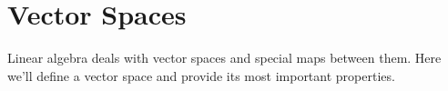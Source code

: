 \chapter{Vector Spaces}

Linear algebra deals with vector spaces and special maps between them.
Here we'll define a vector space and provide its most important properties.



